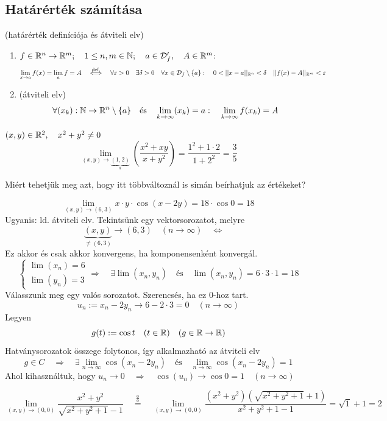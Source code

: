\documentclass[a4paper,11.5pt]{article}
\begin{document}
	\subsection{Határérték számítása}
	\begin{revision} (határérték definíciója és átviteli elv)
		\begin{enumerate}
			\item $f\in\mathbb{R}^n\to\mathbb{R}^m;\quad 1\leq n,m\in\mathbb{N};\quad a\in\mathcal{D}_f',\quad A\in\mathbb{R}^m$:
			\[ \lim_{x\to a}f(x)=\lim_af=A\quad \overset{\text{def.}}{\Longleftrightarrow}\quad \forall\varepsilon>0\quad \exists\delta>0\quad \forall x\in\mathcal{D}_f\setminus\{a\}:\quad 0<||x-a||_{\R^n}<\delta\quad ||f(x)-A||_{\R^m}<\varepsilon \]
			\item (átviteli elv)\[ \forall (x_k):\mathbb{N}\to\mathbb{R}^n\setminus\{a\}\quad \text{és}\quad \lim_{k\to\infty}(x_k)=a:\quad \lim_{k\to\infty}f(x_k)=A \]
		\end{enumerate}
	\end{revision}
	\begin{task} $(x,y)\in\mathbb{R}^2,\quad x^2+y^2\not=0$
		\[ \lim_{(x,y)\to\underbrace{(1,2)}_{a}}\left(\frac{x^2+xy}{x+y^2}\right)=\frac{1^2+1\cdot2}{1+2^2}=\frac{3}{5} \]
	\end{task}
	Miért tehetjük meg azt, hogy itt többváltoznál is simán beírhatjuk az értékeket?
	\begin{task}
		\[ \lim_{(x,y)\to(6,3)}x\cdot y\cdot\cos(x-2y)=18\cdot\cos0=18 \]
		Ugyanis: ld. átviteli elv. Tekintsünk egy vektorsorozatot, melyre
		\[ \underbrace{(x,y)}_{\not=(6,3)}\to(6,3)\quad (n\to\infty)\quad \Leftrightarrow\quad  \]
		Ez akkor és csak akkor konvergens, ha komponensenként konvergál.
		\[\begin{cases}
			\lim(x_n)=6\\
			\lim(y_n)=3
		\end{cases} \Rightarrow\quad \exists\lim(x_n,y_n)\quad \text{és}\quad \lim(x_n,y_n)=6\cdot3\cdot1=18 \]
		Válasszunk meg egy valós sorozatot. Szerencsés, ha ez 0-hoz tart. %
		\[ u_n:=x_n-2y_n\to 6-2\cdot3=0\quad (n\to\infty) \]
		Legyen 
		\[ g(t):=\cos t\quad (t\in\mathbb{R})\quad (g\in\mathbb{R}\to\mathbb{R}) \]
		Hatványsorozatok összege folytonos, így alkalmazható az átviteli elv
		\[ g\in C\quad \Rightarrow\quad \exists\lim_{n\to\infty}\cos(x_n-2y_n)\quad \text{és}\quad \lim_{n\to\infty}\cos(x_n-2y_n)=1 \]
		Ahol kihasználtuk, hogy $u_n\to0\quad \Rightarrow\quad \cos(u_n)\to\cos 0=1\quad (n\to\infty)$
	\end{task}
	\begin{task}
		\[ \lim_{(x,y)\to(0,0)}\frac{x^2+y^2}{\sqrt{x^2+y^2+1}-1}\quad \overset{\frac{0}{0}}{=}\quad \lim_{(x,y)\to(0,0)}\frac{(x^2+y^2)(\sqrt{x^2+y^2+1}+1)}{x^2+y^2+1-1}=\sqrt{1}+1=2 \]
	\end{task}
\end{document}
